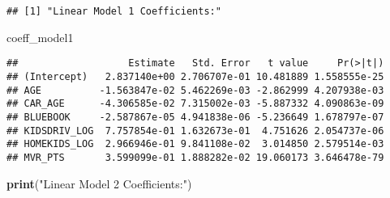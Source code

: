 \documentclass[
]{article}
\newenvironment{Shaded}{\begin{snugshade}}{\end{snugshade}}
\newcommand{\CommentTok}[1]{\textcolor[rgb]{0.56,0.35,0.01}{\textit{#1}}}
\newcommand{\FunctionTok}[1]{\textcolor[rgb]{0.13,0.29,0.53}{\textbf{#1}}}
\newcommand{\NormalTok}[1]{#1}
\newcommand{\OtherTok}[1]{\textcolor[rgb]{0.56,0.35,0.01}{#1}}
\newcommand{\SpecialCharTok}[1]{\textcolor[rgb]{0.81,0.36,0.00}{\textbf{#1}}}
\newcommand{\StringTok}[1]{\textcolor[rgb]{0.31,0.60,0.02}{#1}}
\begin{document}
\begin{Shaded}
\end{Shaded}

\begin{verbatim}
## [1] "Linear Model 1 Coefficients:"
\end{verbatim}

\begin{Shaded}
\begin{Highlighting}[]
\NormalTok{coeff\_model1}
\end{Highlighting}
\end{Shaded}

\begin{verbatim}
##                   Estimate   Std. Error   t value     Pr(>|t|)
## (Intercept)   2.837140e+00 2.706707e-01 10.481889 1.558555e-25
## AGE          -1.563847e-02 5.462269e-03 -2.862999 4.207938e-03
## CAR_AGE      -4.306585e-02 7.315002e-03 -5.887332 4.090863e-09
## BLUEBOOK     -2.587867e-05 4.941838e-06 -5.236649 1.678797e-07
## KIDSDRIV_LOG  7.757854e-01 1.632673e-01  4.751626 2.054737e-06
## HOMEKIDS_LOG  2.966946e-01 9.841108e-02  3.014850 2.579514e-03
## MVR_PTS       3.599099e-01 1.888282e-02 19.060173 3.646478e-79
\end{verbatim}

\begin{Shaded}
\begin{Highlighting}[]
\FunctionTok{print}\NormalTok{(}\StringTok{"Linear Model 2 Coefficients:"}\NormalTok{)}
\end{Highlighting}
\end{Shaded}
\end{document}
